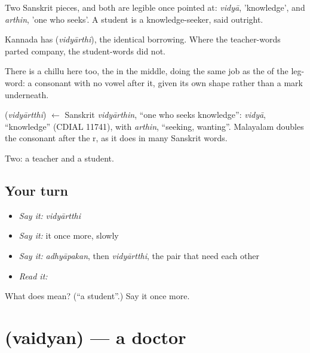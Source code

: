 Two Sanskrit pieces, and both are legible once pointed at: \emph{vidyā}, 'knowledge', and \emph{arthin}, 'one who seeks'. A student is a knowledge-seeker, said outright.

Kannada has  (\emph{vidyārthi}), the identical borrowing. Where the teacher-words parted company, the student-words did not.

There is a chillu here too, the  in the middle, doing the same job as the  of the leg-word: a consonant with no vowel after it, given its own shape rather than a mark underneath.

\begin{cousinweb}
\textbf{} (\emph{vidyārtthi}) $\leftarrow$ Sanskrit \emph{vidyārthin}, \textquotedblleft{}one who seeks knowledge\textquotedblright{}: \emph{vidyā}, \textquotedblleft{}knowledge\textquotedblright{} (CDIAL 11741), with \emph{arthin}, \textquotedblleft{}seeking, wanting\textquotedblright{}. Malayalam doubles the consonant after the r, as it does in many Sanskrit words.
\end{cousinweb}

\begin{grammarlens}[title={What you've built}]
Two: a teacher and a student.
\end{grammarlens}

\subsection*{Your turn}
\begin{itemize}
\raggedright
  \item \emph{Say it:} \emph{vidyārtthi}
  \item \emph{Say it:} it once more, slowly
  \item \emph{Say it:} \emph{adhyāpakan}, then \emph{vidyārtthi}, the pair that need each other
  \item \emph{Read it:} \textbf{}
\end{itemize}

\begin{tcolorbox}[breakable,colback=teal!4,colframe=teal!35!black,title={Before you move on}]
What does  mean? (\textquotedblleft{}a student\textquotedblright{}.) Say it once more.
\end{tcolorbox}
\section[\texorpdfstring{\ml{വൈദ്യൻ} (vaidyan)}{വൈദ്യൻ (vaidyan)}]{ (vaidyan) — a doctor}

